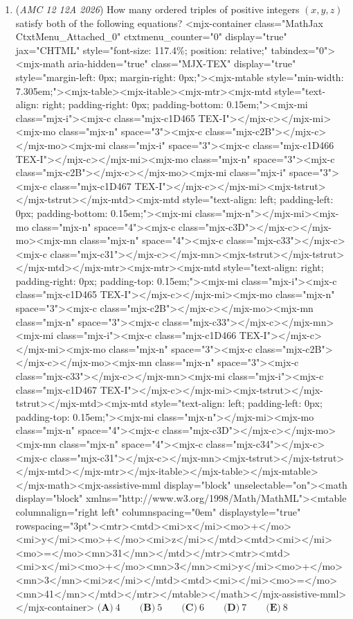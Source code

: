 \begin{enumerate}
	\item (\textit{AMC 12 12A 2026}) How many ordered triples of positive integers $(x,y,z)$ satisfy both of the following equations?
<mjx-container class="MathJax CtxtMenu\_Attached\_0" ctxtmenu\_counter="0" display="true" jax="CHTML" style="font-size: 117.4\%; position: relative;" tabindex="0"><mjx-math aria-hidden="true" class="MJX-TEX" display="true" style="margin-left: 0px; margin-right: 0px;"><mjx-mtable style="min-width: 7.305em;"><mjx-table><mjx-itable><mjx-mtr><mjx-mtd style="text-align: right; padding-right: 0px; padding-bottom: 0.15em;"><mjx-mi class="mjx-i"><mjx-c class="mjx-c1D465 TEX-I"></mjx-c></mjx-mi><mjx-mo class="mjx-n" space="3"><mjx-c class="mjx-c2B"></mjx-c></mjx-mo><mjx-mi class="mjx-i" space="3"><mjx-c class="mjx-c1D466 TEX-I"></mjx-c></mjx-mi><mjx-mo class="mjx-n" space="3"><mjx-c class="mjx-c2B"></mjx-c></mjx-mo><mjx-mi class="mjx-i" space="3"><mjx-c class="mjx-c1D467 TEX-I"></mjx-c></mjx-mi><mjx-tstrut></mjx-tstrut></mjx-mtd><mjx-mtd style="text-align: left; padding-left: 0px; padding-bottom: 0.15em;"><mjx-mi class="mjx-n"></mjx-mi><mjx-mo class="mjx-n" space="4"><mjx-c class="mjx-c3D"></mjx-c></mjx-mo><mjx-mn class="mjx-n" space="4"><mjx-c class="mjx-c33"></mjx-c><mjx-c class="mjx-c31"></mjx-c></mjx-mn><mjx-tstrut></mjx-tstrut></mjx-mtd></mjx-mtr><mjx-mtr><mjx-mtd style="text-align: right; padding-right: 0px; padding-top: 0.15em;"><mjx-mi class="mjx-i"><mjx-c class="mjx-c1D465 TEX-I"></mjx-c></mjx-mi><mjx-mo class="mjx-n" space="3"><mjx-c class="mjx-c2B"></mjx-c></mjx-mo><mjx-mn class="mjx-n" space="3"><mjx-c class="mjx-c33"></mjx-c></mjx-mn><mjx-mi class="mjx-i"><mjx-c class="mjx-c1D466 TEX-I"></mjx-c></mjx-mi><mjx-mo class="mjx-n" space="3"><mjx-c class="mjx-c2B"></mjx-c></mjx-mo><mjx-mn class="mjx-n" space="3"><mjx-c class="mjx-c33"></mjx-c></mjx-mn><mjx-mi class="mjx-i"><mjx-c class="mjx-c1D467 TEX-I"></mjx-c></mjx-mi><mjx-tstrut></mjx-tstrut></mjx-mtd><mjx-mtd style="text-align: left; padding-left: 0px; padding-top: 0.15em;"><mjx-mi class="mjx-n"></mjx-mi><mjx-mo class="mjx-n" space="4"><mjx-c class="mjx-c3D"></mjx-c></mjx-mo><mjx-mn class="mjx-n" space="4"><mjx-c class="mjx-c34"></mjx-c><mjx-c class="mjx-c31"></mjx-c></mjx-mn><mjx-tstrut></mjx-tstrut></mjx-mtd></mjx-mtr></mjx-itable></mjx-table></mjx-mtable></mjx-math><mjx-assistive-mml display="block" unselectable="on"><math display="block" xmlns="http://www.w3.org/1998/Math/MathML"><mtable columnalign="right left" columnspacing="0em" displaystyle="true" rowspacing="3pt"><mtr><mtd><mi>x</mi><mo>+</mo><mi>y</mi><mo>+</mo><mi>z</mi></mtd><mtd><mi></mi><mo>=</mo><mn>31</mn></mtd></mtr><mtr><mtd><mi>x</mi><mo>+</mo><mn>3</mn><mi>y</mi><mo>+</mo><mn>3</mn><mi>z</mi></mtd><mtd><mi></mi><mo>=</mo><mn>41</mn></mtd></mtr></mtable></math></mjx-assistive-mml></mjx-container>
$\textbf{(A)}\   4  \qquad 	\textbf{(B)}\   5  \qquad 	\textbf{(C)}\   6  \qquad 	\textbf{(D)}\   7  \qquad 	\textbf{(E)}\   8$



\end{enumerate}
